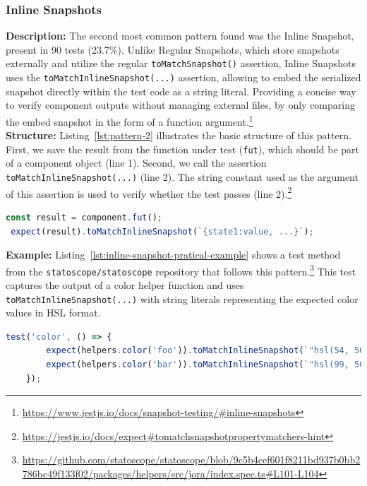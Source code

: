 \documentclass[
	msc, %
	english %
]{../ppgccufmg}
\begin{document}
         \subsubsection{Inline Snapshots} 

        \noindent\textbf{Description:} The second most common pattern found was the Inline Snapshot, present in 90 tests (23.7\%). Unlike Regular Snapshots, which store snapshots externally and utilize the regular \texttt{toMatchSnapshot()} assertion, Inline Snapshots uses the \texttt{toMatchInline\-Snapshot(...)} assertion,
        allowing to embed the serialized snapshot directly within the test code as a string literal. Providing a concise way to verify component outputs without managing external files, by only comparing the embed snapshot in the form of a function argument.\footnote{\url{https://www.jestjs.io/docs/snapshot-testing/\#inline-snapshots}}\\

        \noindent\textbf{Structure:} Listing~\ref{lst:pattern-2} illustrates the basic structure of this pattern. First, we save the result from the function under test (\texttt{fut}), which should be part of a component object (line 1). Second, we call the assertion \texttt{toMatchInlineSnapshot(...)} (line 2). The string constant used as the argument of this assertion is used to verify whether the test passes (line 2).\footnote{\url{https://jestjs.io/docs/expect\#tomatchsnapshotpropertymatchers-hint}}\\

        \begin{lstlisting}[language=javascript, caption=Inline snapshot pattern, label=lst:pattern-2]
 const result = component.fut();
 expect(result).toMatchInlineSnapshot(`{state1:value, ...}`);
        \end{lstlisting}

        \noindent\textbf{Example:} Listing~\ref{lst:inline-snapshot-pratical-example} shows a test method from the \texttt{statoscope/statoscope} repository that follows this pattern.\footnote{\url{https://github.com/statoscope/statoscope/blob/9c5b4cef601f8211bd937b0bb2786bc49f133f02/packages/helpers/src/jora/index.spec.ts\#L101-L104}} This test captures the output of a color helper function and uses \texttt{toMatchInline\-Snapshot(...)} with string literals representing the expected color values in HSL format.\\

        \begin{lstlisting}[language=javascript, caption= Inline snapshot test in \texttt{statoscope/statoscope}, label=lst:inline-snapshot-pratical-example]
    test('color', () => {
        expect(helpers.color('foo')).toMatchInlineSnapshot(`"hsl(54, 50%, 85%)"`);
        expect(helpers.color('bar')).toMatchInlineSnapshot(`"hsl(99, 50%, 85%)"`);
    });
        \end{lstlisting}
\end{document}
